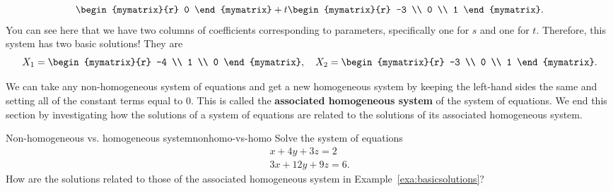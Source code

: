 \begin{solution}
\begin{equation*}
\begin{mymatrix}{r}
      0
    \end{mymatrix}
    + 
    t
    \begin{mymatrix}{r}
      -3 \\
      0 \\
      1
    \end{mymatrix}.
  \end{equation*}
  You can see here that we have two columns of coefficients
  corresponding to parameters, specifically one for $s$ and one for $t$.
  Therefore, this system has two basic solutions! They are
  \begin{equation*}
    X_1=
    \begin{mymatrix}{r}
      -4 \\
      1 \\
      0
    \end{mymatrix},\quad X_2 = \begin{mymatrix}{r}
      -3 \\
      0 \\
      1
    \end{mymatrix}.
  \end{equation*} 
\end{solution}

We can take any non-homogeneous system of equations and get a new
homogeneous system by keeping the left-hand sides the same and setting
all of the constant terms equal to $0$. This is called the
\textbf{associated homogeneous system}
of the system of equations. We end this section by investigating how
the solutions of a system of equations are related to the solutions of
its associated homogeneous system.

\begin{example}{Non-homogeneous vs. homogeneous system}{nonhomo-vs-homo}
  Solve the system of equations
  \begin{equation}\label{eqn:nonhomo-vs-homo-1}
    \begin{array}{c}
      x + 4y + 3z = 2 \\
      3x + 12y + 9z = 6.
    \end{array}
  \end{equation}
  How are the solutions related to those of the associated homogeneous
  system in Example~\ref{exa:basicsolutions}?
\end{example}

